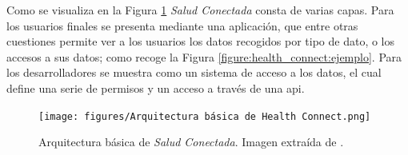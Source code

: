         Como se visualiza en la Figura \ref{figure:health_connect:arquitectura} \textit{Salud Conectada} consta de varias capas. Para los usuarios finales se presenta mediante una aplicación, que entre otras cuestiones permite ver a los usuarios los datos recogidos por tipo de dato, o los accesos a sus datos; como recoge la Figura \ref{figure:health_connect:ejemplo}. Para los desarrolladores se muestra como un sistema de acceso a los datos, el cual define una serie de permisos y un acceso a través de una \gls{api}.

        \begin{figure}[h]
            \centering
            \texttt{[image: figures/Arquitectura básica de Health Connect.png]}
            \caption[Arquitectura básica de \textit{Salud Conectada}]
            {Arquitectura básica de \textit{Salud Conectada}. Imagen extraída de \cite{wilk_introducing_2022}.}
            \label{figure:health_connect:arquitectura}
        \end{figure}

